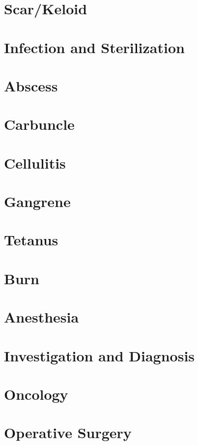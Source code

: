 \documentclass[11pt, a4paper]{article}
\begin{document}
\section{Scar/Keloid}

\section{Infection and Sterilization}

\section{Abscess}

\section{Carbuncle}

\section{Cellulitis}

\section{Gangrene}

\section{Tetanus}

\section{Burn}

\section{Anesthesia}

\section{Investigation and Diagnosis}

\section{Oncology}

\section{Operative Surgery}
\end{document}
